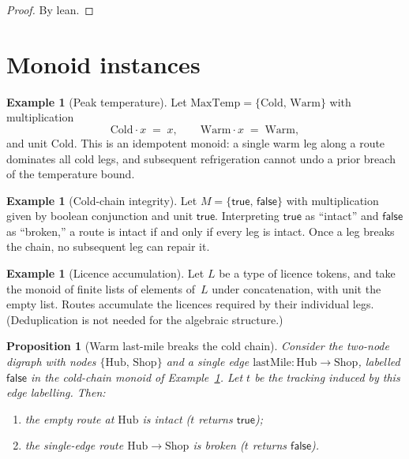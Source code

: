 \documentclass[11pt,a4paper]{article}
\theoremstyle{plain}
\newtheorem{proposition}[theorem]{Proposition}
\theoremstyle{definition}
\newtheorem{example}[theorem]{Example}
\begin{document}
\begin{proof}
By lean.
\end{proof}

\section{Monoid instances}

\begin{example}[Peak temperature]\label{ex:maxtemp}
Let $\mathrm{MaxTemp} = \{\mathrm{Cold},\, \mathrm{Warm}\}$ with multiplication
\begin{equation}
  \mathrm{Cold} \cdot x \;=\; x,
  \qquad
  \mathrm{Warm} \cdot x \;=\; \mathrm{Warm},
\end{equation}
and unit $\mathrm{Cold}$. This is an idempotent monoid: a single warm leg along
a route dominates all cold legs, and subsequent refrigeration cannot undo a
prior breach of the temperature bound.
\end{example}

\begin{example}[Cold-chain integrity]\label{ex:coldchain}
Let $M = \{\mathsf{true},\, \mathsf{false}\}$ with multiplication given by
boolean conjunction and unit $\mathsf{true}$. Interpreting $\mathsf{true}$ as
``intact'' and $\mathsf{false}$ as ``broken,'' a route is intact if and only if
every leg is intact. Once a leg breaks the chain, no subsequent leg can repair
it.
\end{example}

\begin{example}[Licence accumulation]\label{ex:licences}
Let $L$ be a type of licence tokens, and take the monoid of finite lists of
elements of~$L$ under concatenation, with unit the empty list. Routes accumulate
the licences required by their individual legs. (Deduplication is not needed for
the algebraic structure.)
\end{example}

\begin{proposition}[Warm last-mile breaks the cold chain]\label{prop:warm-last-mile}
Consider the two-node digraph with nodes $\{\mathrm{Hub},\, \mathrm{Shop}\}$ and
a single edge $\mathrm{lastMile} : \mathrm{Hub} \to \mathrm{Shop}$, labelled
$\mathsf{false}$ in the cold-chain monoid of Example~\ref{ex:coldchain}. Let
$t$ be the tracking induced by this edge labelling. Then:
\begin{enumerate}
  \item the empty route at $\mathrm{Hub}$ is intact ($t$ returns
        $\mathsf{true}$);
  \item the single-edge route $\mathrm{Hub} \to \mathrm{Shop}$ is broken
        ($t$ returns $\mathsf{false}$).
\end{enumerate}
\end{proposition}
\end{document}
